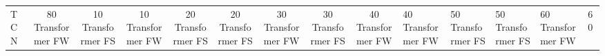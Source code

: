 \begin{table}
\begin{tabular}{|l|c|c|c|c|c|c|c|c|}
TCN & 80%
Transformer FW & 10%
Transformer FS & 10%
Transformer FW & 20%
Transformer FS & 20%
Transformer FS & 30%
Transformer FW & 30%
Transformer FS & 40%
Transformer FW & 40%
Transformer FW & 50%
Transformer FS & 50%
Transformer FS & 60%
Transformer FW & 60%

\end{tabular}
\end{table}
